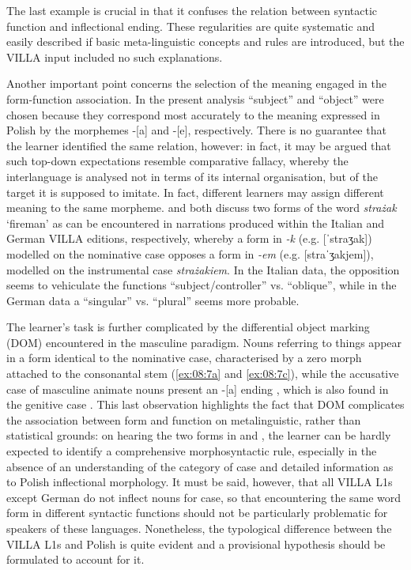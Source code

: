 The last example is crucial in that it confuses the relation between syntactic function and inflectional ending. These regularities are quite systematic and easily described if basic meta-linguistic concepts and rules are introduced, but the VILLA input included no such explanations. 

Another important point concerns the selection of the meaning engaged in the form-function association. In the present analysis “subject” and “object” were chosen because they correspond most accurately to the meaning expressed in Polish by the morphemes -[a] and -[e], respectively. There is no guarantee that the learner identified the same relation, however: in fact, it may be argued that such top-down expectations resemble  comparative fallacy, whereby the interlanguage is analysed not in terms of its internal organisation, but of the target it is supposed to imitate. In fact, different learners may assign different meaning to the same morpheme. \citet{Bernini2018a} and \citet[28-33]{Dimroth2018} both discuss two forms of the word \textit{strażak} ‘fireman’ as can be encountered in narrations produced within the Italian and German VILLA editions, respectively, whereby a form in \textit{{}-k} (e.g. [ˈstraʒak]) modelled on the nominative case opposes a form in \textit{{}-em} (e.g. [straˈʒakjem]), modelled on the instrumental case \textit{strażakiem}. In the Italian data, the opposition seems to vehiculate the functions “subject/controller” vs. “oblique”, while in the German data a “singular” vs. “plural” seems more probable.

The learner’s task is further complicated by the differential object marking (DOM) encountered in the masculine paradigm. Nouns referring to things appear in a form identical to the nominative case, characterised by a zero morph attached to the consonantal stem (\ref{ex:08:7a} and \ref{ex:08:7c}), while the accusative case of masculine animate nouns  present an -[a] ending , which is also found in the genitive case . This last observation highlights the fact that DOM complicates the association between form and function on metalinguistic, rather than statistical grounds: on hearing the two forms in  and , the learner can be hardly expected to identify a comprehensive morphosyntactic rule, especially in the absence of an understanding of the category of case and detailed information as to Polish inflectional morphology. It must be said, however, that all VILLA L1s except German do not inflect nouns for case, so that encountering the same word form in different syntactic functions should not be particularly problematic for speakers of these languages. Nonetheless, the typological difference between the VILLA L1s and Polish is quite evident and a provisional hypothesis should be formulated to account for it. 

